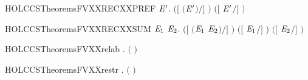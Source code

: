 \newcommand{\HOLCCSTheoremsFVXXRECXXPAR}{\UseVerbatim{HOLCCSTheoremsFVXXRECXXPAR}}
\begin{SaveVerbatim}{HOLCCSTheoremsFVXXRECXXPREF}
\HOLTokenTurnstile{} \HOLSymConst{\HOLTokenForall{}}   \ensuremath{\HOLBoundVar{E}\sp{\prime}}.  \ensuremath{(}\ensuremath{[}  \ensuremath{(}\HOLSymConst{\ensuremath{\ldotp}}\ensuremath{\HOLBoundVar{E}\sp{\prime}}\ensuremath{)}\ensuremath{/}\ensuremath{]} \ensuremath{)} \HOLSymConst{\ensuremath{=}}  \ensuremath{(}\ensuremath{[}  \ensuremath{\HOLBoundVar{E}\sp{\prime}}\ensuremath{/}\ensuremath{]} \ensuremath{)}
\end{SaveVerbatim}
\newcommand{\HOLCCSTheoremsFVXXRECXXPREF}{\UseVerbatim{HOLCCSTheoremsFVXXRECXXPREF}}
\begin{SaveVerbatim}{HOLCCSTheoremsFVXXRECXXSUM}
\HOLTokenTurnstile{} \HOLSymConst{\HOLTokenForall{}}  \ensuremath{\HOLBoundVar{E}\sb{\mathrm{1}}} \ensuremath{\HOLBoundVar{E}\sb{\mathrm{2}}}.
        \ensuremath{(}\ensuremath{[}  \ensuremath{(}\ensuremath{\HOLBoundVar{E}\sb{\mathrm{1}}} \HOLSymConst{\ensuremath{+}} \ensuremath{\HOLBoundVar{E}\sb{\mathrm{2}}}\ensuremath{)}\ensuremath{/}\ensuremath{]} \ensuremath{)} \HOLSymConst{\ensuremath{=}}
        \ensuremath{(}\ensuremath{[}  \ensuremath{\HOLBoundVar{E}\sb{\mathrm{1}}}\ensuremath{/}\ensuremath{]} \ensuremath{)} \HOLConst{\HOLTokenUnion{}}  \ensuremath{(}\ensuremath{[}  \ensuremath{\HOLBoundVar{E}\sb{\mathrm{2}}}\ensuremath{/}\ensuremath{]} \ensuremath{)}
\end{SaveVerbatim}
\newcommand{\HOLCCSTheoremsFVXXRECXXSUM}{\UseVerbatim{HOLCCSTheoremsFVXXRECXXSUM}}
\begin{SaveVerbatim}{HOLCCSTheoremsFVXXrelab}
\HOLTokenTurnstile{} \HOLSymConst{\HOLTokenForall{}} .  \ensuremath{(}  \ensuremath{)} \HOLSymConst{\ensuremath{=}}  
\end{SaveVerbatim}
\newcommand{\HOLCCSTheoremsFVXXrelab}{\UseVerbatim{HOLCCSTheoremsFVXXrelab}}
\begin{SaveVerbatim}{HOLCCSTheoremsFVXXrestr}
\HOLTokenTurnstile{} \HOLSymConst{\HOLTokenForall{}} .  \ensuremath{(}  \ensuremath{)} \HOLSymConst{\ensuremath{=}}  
\end{SaveVerbatim}
